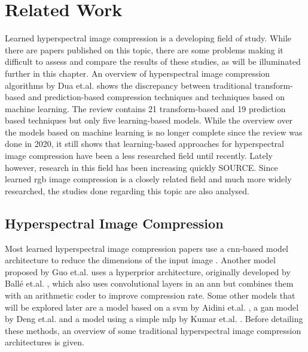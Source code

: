 \chapter{Related Work\label{cha:chapter2}}
Learned hyperspectral image compression is a developing field of study. While there are papers published on this topic, there are some problems making it difficult to assess and compare the results of these studies, as will be illuminated further in this chapter. An overview of hyperspectral image compression algorithms by Dua et.al. \citep{dua_comprehensive_2020} shows the discrepancy between traditional transform-based and prediction-based compression techniques and techniques based on machine learning. The review contains 21 transform-based and 19 prediction based techniques but only five learning-based models. While the overview over the models based on machine learning is no longer complete since the review was done in 2020, it still shows that learning-based approaches for hyperspectral image compression have been a less researched field until recently. Lately however, research in this field has been increasing quickly SOURCE.
Since learned \ac{rgb} image compression is a closely related field and much more widely researched, the studies done regarding this topic are also analysed.
\section{Hyperspectral Image Compression \label{sec:ch2hyperspectral}}
Most learned hyperspectral image compression papers use a \ac{cnn}-based model architecture to reduce the dimensions of the input image \citep{kuester_1d-convolutional_2021}\citep{kuester_transferability_2022}\citep{la_grassa_hyperspectral_2022}. Another model proposed by Guo et.al. \citep{guo_learned_2021} uses a hyperprior architecture, originally developed by Ballé et.al. \citep{balle_end--end_2017}, which also uses convolutional layers in an \ac{ann} but combines them with an arithmetic coder to improve compression rate.
Some other models that will be explored later are a model based on a \ac{svm} by Aidini et.al. \citep{aidini_hyperspectral_2019}, a \ac{gan} model by Deng et.al. \citep{deng_learning-based_2020} and a model using a simple \ac{mlp} by Kumar et.al. \citep{leal-taixe_onboard_2019}. Before detailing these methods, an overview of some traditional hyperspectral image compression architectures is given.
